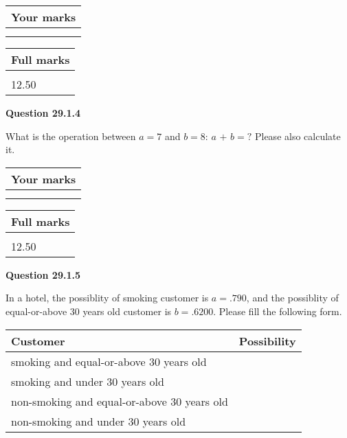 \documentclass[12pt]{article}
\begin{document}
 

 
 

 
\vspace{0.3in}
  
\vspace{0.2in}
  
         \begin{tabular}{|l|}
\hline
 Your marks  \\
\hline
 \\ 
 \\ 
\hline
\end{tabular}
\hspace{0.05in} \begin{tabular}{|l|}
\hline
 Full marks  \\
\hline
 \\ 
12.50 \\
\hline
\end{tabular}
{\textbf{\Large{Question
29.1.4 
}}}
  
  
What is the operation between $a= %
7$ and $b= %
8$:
$a$  %
$+$ $b=?$ Please also calculate it.

 
\vspace{0.3in}
  
\vspace{0.2in}
  
         \begin{tabular}{|l|}
\hline
 Your marks  \\
\hline
 \\ 
 \\ 
\hline
\end{tabular}
\hspace{0.05in} \begin{tabular}{|l|}
\hline
 Full marks  \\
\hline
 \\ 
12.50 \\
\hline
\end{tabular}
{\textbf{\Large{Question
29.1.5 
}}}
  
  
In a hotel, the possiblity of  %
smoking customer is
$a =  %
.790$, and the possiblity of  %
equal-or-above 30 years old customer is $ b =  %
.6200$.
Please fill the following form.
 
\noindent
\begin{tabular}{|l|l|}
\hline
Customer & Possibility \\
\hline
smoking  and   %
equal-or-above 30 years old  & \\
\hline
smoking  and   %
under 30 years old & \\
\hline
 non-smoking and   %
equal-or-above 30 years old  & \\
\hline
 non-smoking and  %
under 30 years old & \\
\hline
\end{tabular}
 
\end{document}
